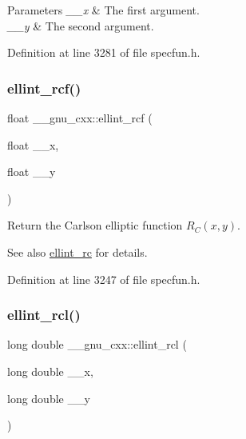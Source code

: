 \begin{DoxyParams}{Parameters}
{\em \+\_\+\+\_\+x} & The first argument. \\
\hline
{\em \+\_\+\+\_\+y} & The second argument. \\
\hline
\end{DoxyParams}


Definition at line 3281 of file specfun.\+h.

\mbox{\label{group__gnu__math__spec__func_gaad5316092224ec3d92b66e79ef266adf}} 
\subsubsection{\texorpdfstring{ellint\+\_\+rcf()}{ellint\_rcf()}}
{\footnotesize\ttfamily float \+\_\+\+\_\+gnu\+\_\+cxx\+::ellint\+\_\+rcf (\begin{DoxyParamCaption}\item[{float}]{\+\_\+\+\_\+x,  }\item[{float}]{\+\_\+\+\_\+y }\end{DoxyParamCaption})\hspace{0.3cm}{\ttfamily [inline]}}

Return the Carlson elliptic function $ R_C(x,y) $.

\begin{DoxySeeAlso}{See also}
\hyperlink{group__gnu__math__spec__func_ga7d3d42f5f71a74266be8aaca528056bf}{ellint\+\_\+rc} for details. 
\end{DoxySeeAlso}


Definition at line 3247 of file specfun.\+h.

\mbox{\label{group__gnu__math__spec__func_ga9b2f1cdeacd3615c702a77d995a0129c}} 
\subsubsection{\texorpdfstring{ellint\+\_\+rcl()}{ellint\_rcl()}}
{\footnotesize\ttfamily long double \+\_\+\+\_\+gnu\+\_\+cxx\+::ellint\+\_\+rcl (\begin{DoxyParamCaption}\item[{long double}]{\+\_\+\+\_\+x,  }\item[{long double}]{\+\_\+\+\_\+y }\end{DoxyParamCaption})\hspace{0.3cm}{\ttfamily [inline]}}


